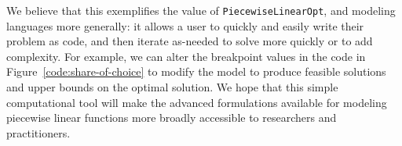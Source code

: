 \documentclass[opre,nonblindrev]{informs3} %
\newcommand{\Log}{\texttt{LogE}}
\newcommand{\Inc}{\texttt{Inc}}
\begin{document}


We believe that this exemplifies the value of \texttt{PiecewiseLinearOpt}, and modeling languages more generally: it allows a user to quickly and easily write their problem as code, and then iterate as-needed to solve more quickly or to add complexity. For example, we can alter the breakpoint values in the code in Figure~\ref{code:share-of-choice} to modify the model to produce feasible solutions and upper bounds on the optimal solution. We hope that this simple computational tool will make the advanced formulations available for modeling piecewise linear functions more broadly accessible to researchers and practitioners.
\end{document}
